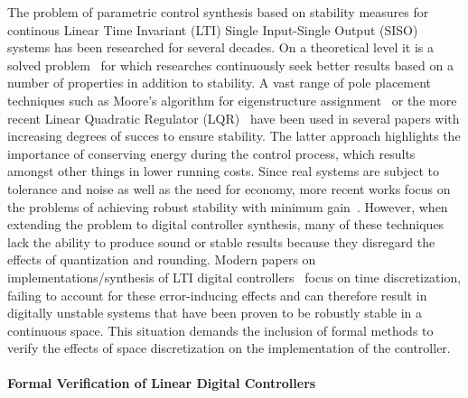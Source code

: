 \documentclass{sig-alternate-05-2015}
\begin{document}
The problem of parametric control synthesis based on stability measures for
continous Linear Time Invariant (LTI) Single Input-Single Output (SISO)
systems has been researched for several decades.  On a theoretical level it
is a solved problem~\cite{wonham1967pole} for which researches continuously
seek better results based on a number of properties in addition to
stability.  A vast range of pole placement techniques such as Moore's
algorithm for eigenstructure assignment~\cite{klein1977eigenvalue} or the
more recent Linear Quadratic Regulator (LQR)~\cite{bemporad2002explicit}
have been used in several papers with increasing degrees of succes to ensure
stability.  The latter approach highlights the importance of conserving
energy during the control process, which results amongst other things in
lower running costs.  Since real systems are subject to tolerance and noise
as well as the need for economy, more recent works focus on the problems of
achieving robust stability with minimum
gain~\cite{schmid2014unified,konigorski2012pole}.  However, when extending
the problem to digital controller synthesis, many of these techniques lack
the ability to produce sound or stable results because they disregard the
effects of quantization and rounding.  Modern papers on
implementations/synthesis of LTI digital
controllers~\cite{das2013lqr,ghosh2013fpga} focus on time discretization,
failing to account for these error-inducing effects and can therefore result
in digitally unstable systems that have been proven to be robustly stable in
a continuous space.  This situation demands the inclusion of formal methods
to verify the effects of space discretization on the implementation of the
controller.

\paragraph{Formal Verification of Linear Digital Controllers} 
\end{document}
